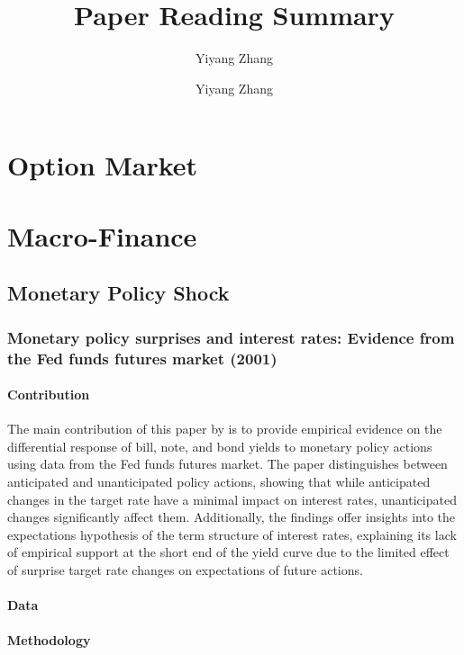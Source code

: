 \documentclass[10pt]{report}
\author{Yiyang Zhang}
\title{Paper Reading Summary}
\author{Yiyang Zhang}
\begin{document}
\setlength{\parindent}{0pt}
\maketitle
\setcounter{tocdepth}{2}
\setcounter{secnumdepth}{4}

\tableofcontents
\newpage

\chapter{Option Market}



\chapter{Macro-Finance}
\section{Monetary Policy Shock}
\subsection{Monetary policy surprises and interest rates: Evidence from the Fed funds futures market (2001)}

\subsubsection{Contribution}

The main contribution of this paper by \citet{Kuttner2001MonetaryPS} is to provide empirical evidence on the differential response of bill, note, and bond yields to monetary policy actions using data from the Fed funds futures market. The paper distinguishes between anticipated and unanticipated policy actions, showing that while anticipated changes in the target rate have a minimal impact on interest rates, unanticipated changes significantly affect them. Additionally, the findings offer insights into the expectations hypothesis of the term structure of interest rates, explaining its lack of empirical support at the short end of the yield curve due to the limited effect of surprise target rate changes on expectations of future actions.

\subsubsection{Data}




\subsubsection{Methodology}
\end{document}
